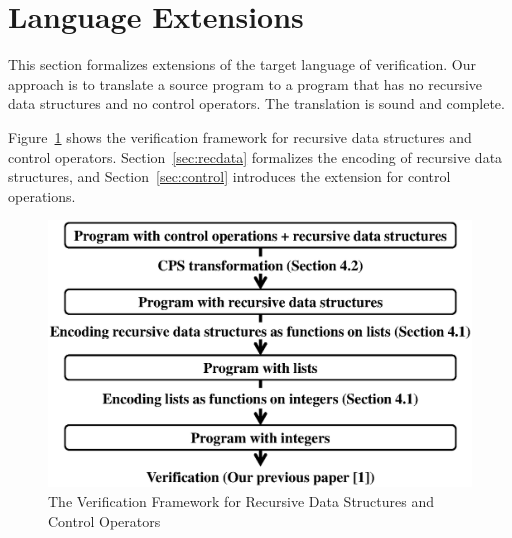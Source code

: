 \vspace{-5pt}
\section{Language Extensions}
\label{sec:extension}

This section formalizes extensions of the target language of
verification.  Our approach is to translate a source program to a
program that has no recursive data structures and no control operators.
The translation is sound and complete.

Figure~\ref{fig:extension} shows the verification framework for recursive data structures and control
operators.
Section~\ref{sec:recdata} formalizes the encoding of recursive data
structures, and Section~\ref{sec:control} introduces the extension for
control operations.

\begin{figure}[t]
 \begin{center}
  \includegraphics[scale=0.35]{extension.eps}
 \end{center}
\caption{The Verification Framework for Recursive Data Structures and Control Operators}
\label{fig:extension}
\end{figure}



